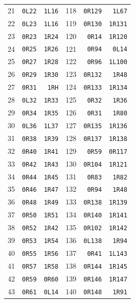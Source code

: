 \begin{longtable}{@{}rrr@{\hspace{20pt}}rrr@{}}
21 & \texttt{0L22} & \texttt{1L16} & 118 & \texttt{0R129} & \texttt{1L67}\\
22 & \texttt{0L23} & \texttt{1L16} & 119 & \texttt{0R130} & \texttt{1R131}\\
23 & \texttt{0R23} & \texttt{1R24} & 120 & \texttt{0R14} & \texttt{1R120}\\
24 & \texttt{0R25} & \texttt{1R26} & 121 & \texttt{0R94} & \texttt{0L14}\\
25 & \texttt{0R27} & \texttt{1R28} & 122 & \texttt{0R96} & \texttt{1L100}\\
26 & \texttt{0R29} & \texttt{1R30} & 123 & \texttt{0R132} & \texttt{1R48}\\
27 & \texttt{0R31} & \texttt{1RH} & 124 & \texttt{0R133} & \texttt{1R134}\\
28 & \texttt{0L32} & \texttt{1R33} & 125 & \texttt{0R32} & \texttt{1R36}\\
29 & \texttt{0R34} & \texttt{1R35} & 126 & \texttt{0R31} & \texttt{1R80}\\
30 & \texttt{0L36} & \texttt{1L37} & 127 & \texttt{0R135} & \texttt{1R136}\\
31 & \texttt{0R38} & \texttt{1R39} & 128 & \texttt{0R137} & \texttt{1R138}\\
32 & \texttt{0R40} & \texttt{1R41} & 129 & \texttt{0R59} & \texttt{0R117}\\
33 & \texttt{0R42} & \texttt{1R43} & 130 & \texttt{0R104} & \texttt{1R121}\\
34 & \texttt{0R44} & \texttt{1R45} & 131 & \texttt{0R83} & \texttt{1R82}\\
35 & \texttt{0R46} & \texttt{1R47} & 132 & \texttt{0R94} & \texttt{1R48}\\
36 & \texttt{0R48} & \texttt{1R49} & 133 & \texttt{0R138} & \texttt{1R139}\\
37 & \texttt{0R50} & \texttt{1R51} & 134 & \texttt{0R140} & \texttt{1R141}\\
38 & \texttt{0R52} & \texttt{1R42} & 135 & \texttt{0R102} & \texttt{1R142}\\
39 & \texttt{0R53} & \texttt{1R54} & 136 & \texttt{0L138} & \texttt{1R94}\\
40 & \texttt{0R55} & \texttt{1R56} & 137 & \texttt{0R41} & \texttt{1L143}\\
41 & \texttt{0R57} & \texttt{1R58} & 138 & \texttt{0R144} & \texttt{1R145}\\
42 & \texttt{0R59} & \texttt{0R60} & 139 & \texttt{0R146} & \texttt{1R147}\\
43 & \texttt{0R61} & \texttt{0L14} & 140 & \texttt{0R148} & \texttt{1R91}\\

\end{longtable}
